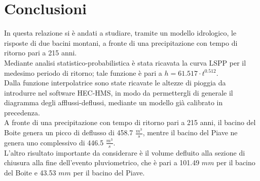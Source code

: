 \section{Conclusioni}
In questa relazione si è andati a studiare, tramite un modello idrologico, le risposte di due bacini montani, a fronte di una precipitazione con tempo di ritorno pari a 215 anni.\\
Mediante analisi statistico-probabilistica è stata ricavata la curva LSPP per il medesimo periodo di ritorno; tale funzione è pari a $h=61.517 \cdot t ^{0.512}$.\\
Dalla funzione interpolatrice sono state ricavate le altezze di pioggia da introdurre nel software HEC-HMS, in modo da permettergli di generale il diagramma degli afflussi-deflussi, mediante un modello già calibrato in precedenza.\\
A fronte di una precipitazione con tempo di ritorno pari a 215 anni, il bacino del Boite genera un picco di deflusso di 458.7 $\frac{m^3}{s}$, mentre il bacino del Piave ne genera uno complessivo di 446.5 $\frac{m^3}{s}$.\\
L'altro risultato importante da considerare è il volume defluito alla sezione di chiusura alla fine dell'evento pluviometrico, che è pari a 101.49 $mm$ per il bacino del Boite e 43.53 $mm$ per il bacino del Piave.
